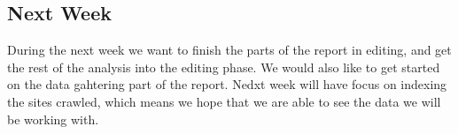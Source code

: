 \subsection*{Next Week}
During the next week we want to finish the parts of the report in editing, and
get the rest of the analysis into the editing phase. We would also like to get
started on the data gahtering part of the report. Nedxt week will have focus on
indexing the sites crawled, which means we hope that we are able to see the data
we will be working with.